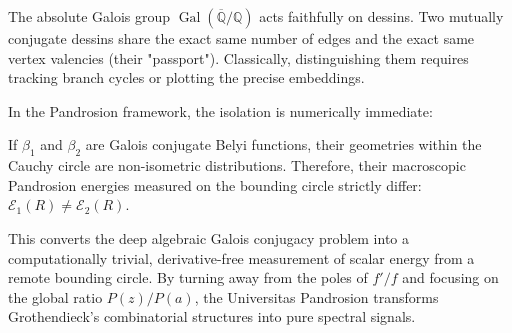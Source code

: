 The absolute Galois group $\operatorname{Gal}(\overline{\mathbb{Q}}/\mathbb{Q})$ acts faithfully on dessins. Two mutually conjugate dessins share the exact same number of edges and the exact same vertex valencies (their "passport"). Classically, distinguishing them requires tracking branch cycles or plotting the precise embeddings.

In the Pandrosion framework, the isolation is numerically immediate:
\begin{fact}
If $\beta_1$ and $\beta_2$ are Galois conjugate Belyi functions, their geometries within the Cauchy circle are non-isometric distributions. Therefore, their macroscopic Pandrosion energies measured on the bounding circle strictly differ: $\mathcal{E}_1(R) \neq \mathcal{E}_2(R)$.
\end{fact}

This converts the deep algebraic Galois conjugacy problem into a computationally trivial, derivative-free measurement of scalar energy from a remote bounding circle. By turning away from the poles of $f'/f$ and focusing on the global ratio $P(z)/P(a)$, the Universitas Pandrosion transforms Grothendieck's combinatorial structures into pure spectral signals.
